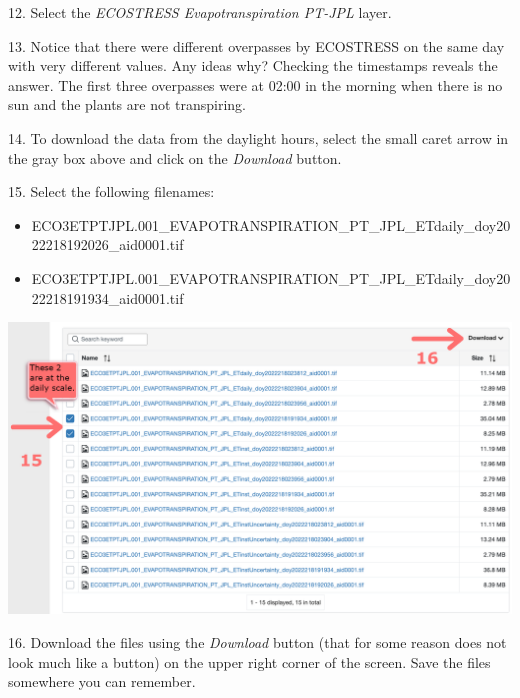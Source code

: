 \documentclass[oneside,a4paper,11pt,explicit]{book}
\begin{document}
\vspace{.5em}

12. Select the \textit{ECOSTRESS Evapotranspiration PT-JPL} layer.

13. Notice that there were different overpasses by ECOSTRESS on the same day with very different values. Any ideas why? Checking the timestamps reveals the answer. The first three overpasses were at 02:00 in the morning when there is no sun and the plants are not transpiring.

14. To download the data from the daylight hours, select the small caret arrow in the gray box above and click on the \textit{Download} button.

15. Select the following filenames:

\begin{itemize}
	\item ECO3ETPTJPL.001\_EVAPOTRANSPIRATION\_PT\_JPL\_ETdaily\_doy2022218192026\_aid0001.tif
	\item ECO3ETPTJPL.001\_EVAPOTRANSPIRATION\_PT\_JPL\_ETdaily\_doy2022218191934\_aid0001.tif
\end{itemize}

\vspace{.5em}

\centerline{\includegraphics[width=.8\textwidth]{ETdownload.png}}

\vspace{.5em}


16. Download the files using the \textit{Download} button (that for some reason does not look much like a button) on the upper right corner of the screen. Save the files somewhere you can remember. 
\end{document}
